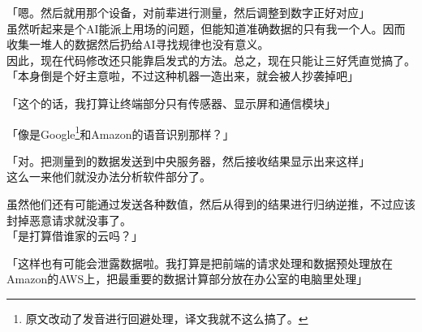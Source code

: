 「嗯。然后就用那个设备，对前辈进行测量，然后调整到数字正好对应」\\

虽然听起来是个AI能派上用场的问题，但能知道准确数据的只有我一个人。因而收集一堆人的数据然后扔给AI寻找规律也没有意义。\\

因此，现在代码修改还只能靠启发式的方法。总之，现在只能让三好凭直觉搞了。\\

「本身倒是个好主意啦，不过这种机器一造出来，就会被人抄袭掉吧」

「这个的话，我打算让终端部分只有传感器、显示屏和通信模块」

「像是Google\footnote{原文改动了发音进行回避处理，译文我就不这么搞了。}和Amazon的语音识别那样？」

「对。把测量到的数据发送到中央服务器，然后接收结果显示出来这样」\\

这么一来他们就没办法分析软件部分了。

虽然他们还有可能通过发送各种数值，然后从得到的结果进行归纳逆推，不过应该封掉恶意请求就没事了。\\

「是打算借谁家的云吗？」

「这样也有可能会泄露数据啦。我打算是把前端的请求处理和数据预处理放在Amazon的AWS上，把最重要的数据计算部分放在办公室的电脑里处理」

